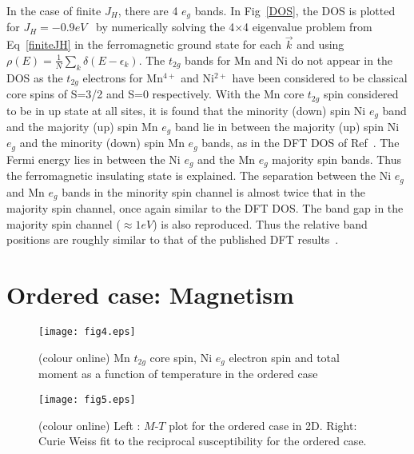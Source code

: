 \documentclass[english,aps,prb,twocolumn,showpacs]{revtex4-1}
\begin{document}
In the case of finite $J_{H}$, there are 4 $e_{g}$ bands.
 In Fig~\ref{DOS}, the DOS is plotted for $J_{H}=-0.9eV$~\cite{Tanusri} by numerically solving the 4$\times$4 eigenvalue
 problem from Eq~\ref{finiteJH} in the ferromagnetic ground state for each $\vec{k}$ and using $\rho(E)=\frac{1}{N}\sum_{k}\delta(E-\epsilon_{k})$. 
The $t_{2g}$ bands for Mn and Ni do not appear in the DOS as the $t_{2g}$ electrons for Mn$^{4+}$ and Ni$^{2+}$ have been
 considered to be classical core spins of S=3/2 and S=0 respectively.
With the Mn core $t_{2g}$ spin considered to be in up state at all sites,
 it is found that the minority (down) spin Ni $e_{g}$ band and the majority (up) spin Mn $e_{g}$ band 
lie in between the majority (up) spin Ni $e_{g}$ and the minority (down) spin Mn $e_{g}$  bands, as in the DFT DOS 
of Ref~\cite{Tanusri}. The Fermi energy lies in between the Ni $e_{g}$ and the Mn $e_{g}$ majority spin  
 bands. Thus the ferromagnetic insulating state is explained. The separation between the Ni $e_{g}$ and Mn $e_{g}$
 bands in the minority spin channel is almost twice that in the majority spin channel, once again similar to the DFT DOS.
 The band gap in the majority spin channel ($\approx 1 eV$) is also reproduced. Thus the relative band positions are  
 roughly similar to that of the published DFT results~\cite{bandwidth}. 


\section{Ordered case: Magnetism}


\begin{figure}
\texttt{[image: fig4.eps]} \\
\caption{(colour online) Mn $t_{2g}$ core spin, Ni $e_{g}$ electron spin and total moment as a function of temperature in the ordered case}  
\label{moment}
\end{figure}



\begin{figure}
\texttt{[image: fig5.eps]} \\
\caption{(colour online) Left : $M$-$T$ plot  
 for the ordered case in 2D.
  Right: Curie Weiss fit to the reciprocal susceptibility for the ordered case.}
\label{ordered}
\end{figure}
\end{document}
